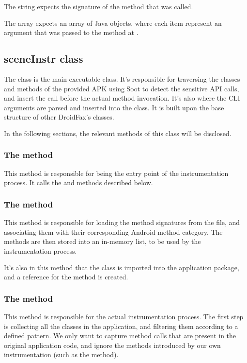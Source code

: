 The  string expects the signature of the method that was called. 

The  array expects an array of Java objects, where each item represent an argument that was passed to the method at .

\subsection{sceneInstr class}

The  class is the main executable class. It's responsible for traversing the classes and methods of the provided APK using Soot to detect the sensitive API calls, and insert the  call before the actual method invocation. It's also where the CLI arguments are parsed and inserted into the  class. It is built upon the base structure of other DroidFax's  classes.

In the following sections, the relevant methods of this class will be disclosed.

\subsubsection{The  method}

This method is responsible for being the entry point of the instrumentation process. It calls the  and  methods described below.

\subsubsection{The  method}

This method is responsible for loading the method signatures from the  file, and associating them with their corresponding Android method category. The methods are then stored into an in-memory list, to be used by the instrumentation process.

It's also in this method that the  class is imported into the application package, and a reference for the  method is created.

\subsubsection{The  method}

This method is responsible for the actual instrumentation process. The first step is collecting all the classes in the application, and filtering them according to a defined pattern. We only want to capture method calls that are present in the original application code, and ignore the methods introduced by our own instrumentation (such as the  method).

